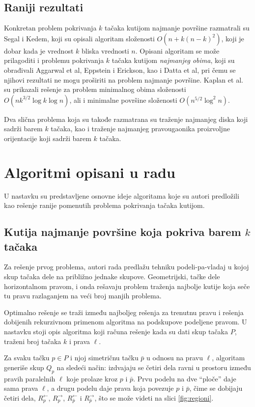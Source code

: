\documentclass[a4paper]{article}
\begin{document}
\subsection{Raniji rezultati}

Konkretan problem pokrivanja $k$ tačaka kutijom najmanje površine razmatrali su Segal i Kedem, koji su opisali algoritam složenosti
$O ( n + k (n - k)^2 )$, koji je dobar kada je vrednost $k$ bliska vrednosti $n$. Opisani algoritam se može prilagoditi i problemu
pokrivanja $k$ tačaka kutijom {\em najmanjeg obima}, koji su obrađivali Aggarwal et al, Eppstein i Erickson, kao i Datta et al,
pri čemu se njihovi rezultati ne mogu proširiti na problem najmanje površine. Kaplan et al. su prikazali rešenje za problem minimalnog obima složenosti $O (n k^{3/2} \log k \log n)$, ali i minimalne površine složenosti $O (n^{5/2} \log^2 n)$.

Dva slična problema koja su takođe razmatrana su traženje najmanjeg diska koji sadrži barem $k$ tačaka, kao i traženje najmanjeg pravougaonika proizvoljne orijentacije koji sadrži barem $k$ tačaka.

\section{Algoritmi opisani u radu}

U nastavku su predstavljene osnovne ideje algoritama koje su autori predložili kao rešenje ranije pomenutih problema pokrivanja tačaka kutijom.

\subsection{Kutija najmanje površine koja pokriva barem $k$ tačaka}

Za rešenje prvog problema, autori rada predlažu tehniku podeli-pa-vladaj u kojoj skup tačaka dele na približno jednake skupove. Geometrijski,
tačke dele horizontalnom pravom, i onda rešavaju problem traženja najbolje kutije koja seče tu pravu razlaganjem na veći broj manjih problema.

Optimalno rešenje se traži između najboljeg rešenja za trenutnu pravu i rešenja dobijenih rekurzivnom primenom algoritma na podskupove
podeljene pravom. U nastavku stoji opis algoritma koji računa rešenje kada su dati skup tačaka $P$, traženi broj tačaka $k$ i prava $\ell$.

Za svaku tačku $p \in P$ i njoj simetričnu tačku $\bar{p}$ u odnosu na pravu $\ell$, algoritam generiše skup $Q_p$ na sledeći način:
izdvajaju se četiri dela ravni u prostoru između pravih paralelnih $\ell$ koje prolaze kroz $p$ i $\bar{p}$. Prvu podelu na dve ``ploče'' daje sama prava $\ell$, a drugu podelu daje prava koja povezuje $p$ i $\bar{p}$, čime se dobijaju četiri dela, $R_p^\leftarrow$, $R_p^\rightarrow$, $R_{\bar{p}}^\leftarrow$ i $R_{\bar{p}}^\rightarrow$, što se može videti na slici \ref{fig:regioni}.
\end{document}
